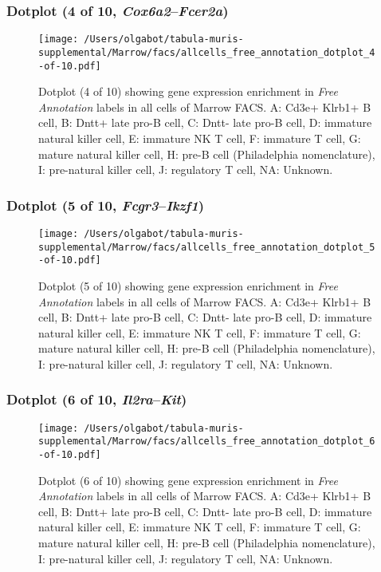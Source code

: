 \clearpage

\subsubsection{Dotplot (4 of 10, \emph{Cox6a2}--\emph{Fcer2a})}
\begin{figure}[h]
\centering
\texttt{[image: /Users/olgabot/tabula-muris-supplemental/Marrow/facs/allcells\_free\_annotation\_dotplot\_4-of-10.pdf]}

\caption{ Dotplot (4 of 10)  showing gene expression enrichment in \emph{Free Annotation} labels in all cells of Marrow FACS. A: Cd3e+ Klrb1+ B cell, B: Dntt+ late pro-B cell, C: Dntt- late pro-B cell, D: immature natural killer cell, E: immature NK T cell, F: immature T cell, G: mature natural killer cell, H: pre-B cell (Philadelphia nomenclature), I: pre-natural killer cell, J: regulatory T cell, NA: Unknown.}
\end{figure}


\clearpage

\subsubsection{Dotplot (5 of 10, \emph{Fcgr3}--\emph{Ikzf1})}
\begin{figure}[h]
\centering
\texttt{[image: /Users/olgabot/tabula-muris-supplemental/Marrow/facs/allcells\_free\_annotation\_dotplot\_5-of-10.pdf]}

\caption{ Dotplot (5 of 10)  showing gene expression enrichment in \emph{Free Annotation} labels in all cells of Marrow FACS. A: Cd3e+ Klrb1+ B cell, B: Dntt+ late pro-B cell, C: Dntt- late pro-B cell, D: immature natural killer cell, E: immature NK T cell, F: immature T cell, G: mature natural killer cell, H: pre-B cell (Philadelphia nomenclature), I: pre-natural killer cell, J: regulatory T cell, NA: Unknown.}
\end{figure}


\clearpage

\subsubsection{Dotplot (6 of 10, \emph{Il2ra}--\emph{Kit})}
\begin{figure}[h]
\centering
\texttt{[image: /Users/olgabot/tabula-muris-supplemental/Marrow/facs/allcells\_free\_annotation\_dotplot\_6-of-10.pdf]}

\caption{ Dotplot (6 of 10)  showing gene expression enrichment in \emph{Free Annotation} labels in all cells of Marrow FACS. A: Cd3e+ Klrb1+ B cell, B: Dntt+ late pro-B cell, C: Dntt- late pro-B cell, D: immature natural killer cell, E: immature NK T cell, F: immature T cell, G: mature natural killer cell, H: pre-B cell (Philadelphia nomenclature), I: pre-natural killer cell, J: regulatory T cell, NA: Unknown.}
\end{figure}


